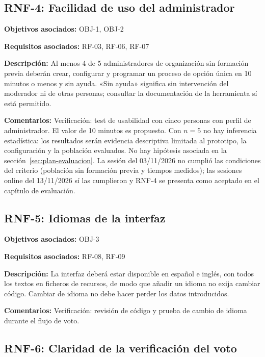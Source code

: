\subsection{RNF-4: Facilidad de uso del administrador}

\textbf{Objetivos asociados:} OBJ-1, OBJ-2\par
\textbf{Requisitos asociados:} RF-03, RF-06, RF-07\par
\textbf{Descripción:} Al menos 4 de 5 administradores de organización sin formación previa deberán crear, configurar y programar un proceso de opción única en 10 minutos o menos y sin ayuda. «Sin ayuda» significa sin intervención del moderador ni de otras personas; consultar la documentación de la herramienta sí está permitido.\par
\textbf{Comentarios:} Verificación: test de usabilidad con cinco personas con perfil de administrador. El valor de 10 minutos es propuesto. Con $n = 5$ no hay inferencia estadística: los resultados serán evidencia descriptiva limitada al prototipo, la configuración y la población evaluados. No hay hipótesis asociada en la sección~\ref{sec:plan-evaluacion}. La sesión del 03/11/2026 no cumplió las condiciones del criterio (población sin formación previa y tiempos medidos); las sesiones online del 13/11/2026 sí las cumplieron y RNF-4 se presenta como aceptado en el capítulo de evaluación.\par

\subsection{RNF-5: Idiomas de la interfaz}

\textbf{Objetivos asociados:} OBJ-3\par
\textbf{Requisitos asociados:} RF-08, RF-09\par
\textbf{Descripción:} La interfaz deberá estar disponible en español e inglés, con todos los textos en ficheros de recursos, de modo que añadir un idioma no exija cambiar código. Cambiar de idioma no debe hacer perder los datos introducidos.\par
\textbf{Comentarios:} Verificación: revisión de código y prueba de cambio de idioma durante el flujo de voto.\par

\subsection{RNF-6: Claridad de la verificación del voto}

